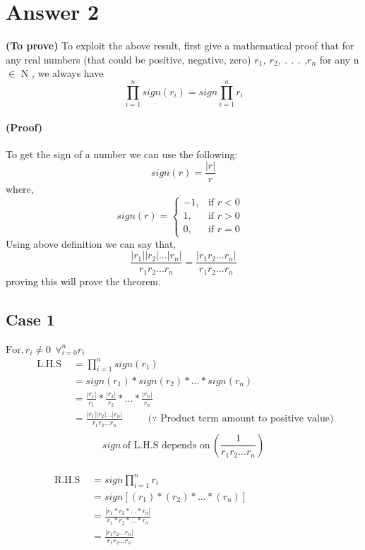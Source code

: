\documentclass{article}
\begin{document}
\section{Answer 2}
\label{gen_inst}
\textbf{(To prove)}  To exploit the above result, first give a mathematical proof that for any real numbers
(that could be positive, negative, zero) \emph{$r_1$, $r_2$, . . . ,$ r_n$} for any n $\in$ N , we always have
\[\prod_{i=1 }^n sign(r_i) = sign \prod_{i=1}^n r_i\]

\paragraph{(Proof)}
To get the sign of a number we can use the following:
\begin{equation} \label{eq2}
sign(r)= \frac{|r|}{r}
\end{equation}
where,
$$
sign(r)=\begin{cases}
			-1, & \text{if $r<0$ }\\
            1, & \text{if $r>0$}\\
	0, & \text{if $r=0$}
		 \end{cases}
$$
Using above definition we can say that,
\[ \frac{|r_1||r_2|...|r_n|}{r_1r_2...r_n} = \frac {|r_1r_2...r_n|}{r_1r_2...r_n}\]
proving this will prove the theorem.\\

\subsection{Case 1}

$ \text{For,} \, r_i \ne 0  \;\, \forall_{i=0}^n r_i $
\begin{equation} \label{eq3}
\begin{split}
\text{ L.H.S } & =  \prod_{i=1 }^n sign(r_1)  \\
& = sign(r_1)*sign(r_2)*\dots *sign(r_n)  \\
& = \frac{|r_1|}{r_1}*\frac{|r_2|}{r_2}*\dots * \frac{|r_n|}{r_n}\\
& = \frac{|r_1||r_2|...|r_n|}{r_1r_2...r_n}\, \hspace{1cm} \text{($\because$ Product term amount to positive value)}\\
\end{split}
\end{equation}
\[sign \, \text{of L.H.S depends on}\, (\frac{1}{r_1r_2...r_n})\]
\\
\begin{equation} \label{eq4}
\begin{split}
\text{ R.H.S } & =  sign \prod_{i=1}^n r_i \\
& = sign[(r_1)*(r_2)*\dots *(r_n)]  \\
& = \frac{|r_1*r_2* \dots *r_n|}{r_1*r_2* \dots *r_n} \hspace{7cm}\\
& = \frac{|r_1r_2\dots r_n|}{r_1r_2...r_n}  \\
\end{split}
\end{equation}
\end{document}
